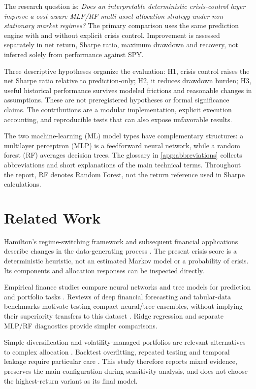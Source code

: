 \documentclass[3p,times]{elsarticle}
\begin{document}
The research question is: \emph{Does an interpretable deterministic crisis-control layer improve a cost-aware MLP/RF multi-asset allocation strategy under non-stationary market regimes?} The primary comparison uses the same prediction engine with and without explicit crisis control. Improvement is assessed separately in net return, Sharpe ratio, maximum drawdown and recovery, not inferred solely from performance against SPY.

Three descriptive hypotheses organize the evaluation: H1, crisis control raises the net Sharpe ratio relative to prediction-only; H2, it reduces drawdown burden; H3, useful historical performance survives modeled frictions and reasonable changes in assumptions. These are not preregistered hypotheses or formal significance claims. The contributions are a modular implementation, explicit execution accounting, and reproducible tests that can also expose unfavorable results.

The two machine-learning (ML) model types have complementary structures: a multilayer perceptron (MLP) is a feedforward neural network, while a random forest (RF) averages decision trees. The glossary in \ref{app:abbreviations} collects abbreviations and short explanations of the main technical terms. Throughout the report, RF denotes Random Forest, not the return reference used in Sharpe calculations.

\section{Related Work}
Hamilton's regime-switching framework and subsequent financial applications describe changes in the data-generating process \cite{hamilton1989new,guidolin2011markov}. The present crisis score is a deterministic heuristic, not an estimated Markov model or a probability of crisis. Its components and allocation responses can be inspected directly.

Empirical finance studies compare neural networks and tree models for prediction and portfolio tasks \cite{gu2020empirical,krauss2017deep}. Reviews of deep financial forecasting and tabular-data benchmarks motivate testing compact neural/tree ensembles, without implying their superiority transfers to this dataset \cite{sezer2020financial,grinsztajn2022why}. Ridge regression and separate MLP/RF diagnostics provide simpler comparisons.

Simple diversification and volatility-managed portfolios are relevant alternatives to complex allocation \cite{demiguel2009optimal,moreira2017volatility}. Backtest overfitting, repeated testing and temporal leakage require particular care \cite{lopez2018advances,white2000reality,bailey2016probability,harvey2016and}. This study therefore reports mixed evidence, preserves the main configuration during sensitivity analysis, and does not choose the highest-return variant as its final model.
\end{document}
